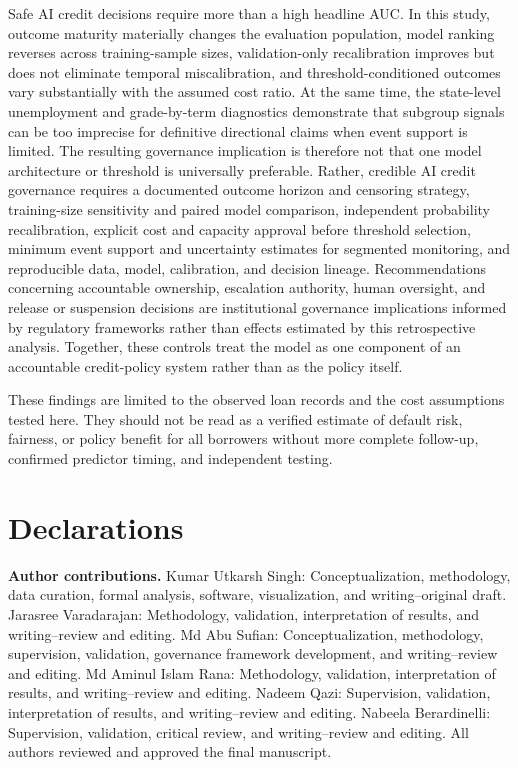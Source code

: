 \documentclass[10pt]{article}
\begin{document}
Safe AI credit decisions require more than a high headline AUC. In this study, outcome maturity materially changes the evaluation population, model ranking reverses across training-sample sizes, validation-only recalibration improves but does not eliminate temporal miscalibration, and threshold-conditioned outcomes vary substantially with the assumed cost ratio. At the same time, the state-level unemployment and grade-by-term diagnostics demonstrate that subgroup signals can be too imprecise for definitive directional claims when event support is limited. The resulting governance implication is therefore not that one model architecture or threshold is universally preferable. Rather, credible AI credit governance requires a documented outcome horizon and censoring strategy, training-size sensitivity and paired model comparison, independent probability recalibration, explicit cost and capacity approval before threshold selection, minimum event support and uncertainty estimates for segmented monitoring, and reproducible data, model, calibration, and decision lineage. Recommendations concerning accountable ownership, escalation authority, human oversight, and release or suspension decisions are institutional governance implications informed by regulatory frameworks rather than effects estimated by this retrospective analysis. Together, these controls treat the model as one component of an accountable credit-policy system rather than as the policy itself.

These findings are limited to the observed loan records and the cost assumptions tested here. They should not be read as a verified estimate of default risk, fairness, or policy benefit for all borrowers without more complete follow-up, confirmed predictor timing, and independent testing.

 \section*{Declarations}

 \noindent\textbf{Author contributions.}
 Kumar Utkarsh Singh: Conceptualization, methodology, data curation, formal analysis, software, visualization, and writing--original draft.
 Jarasree Varadarajan: Methodology, validation, interpretation of results, and writing--review and editing.
 Md Abu Sufian: Conceptualization, methodology, supervision, validation, governance framework development, and writing--review and editing.
 Md Aminul Islam Rana: Methodology, validation, interpretation of results, and writing--review and editing.
 Nadeem Qazi: Supervision, validation, interpretation of results, and writing--review and editing.
 Nabeela Berardinelli: Supervision, validation, critical review, and writing--review and editing.
 All authors reviewed and approved the final manuscript.
\end{document}
